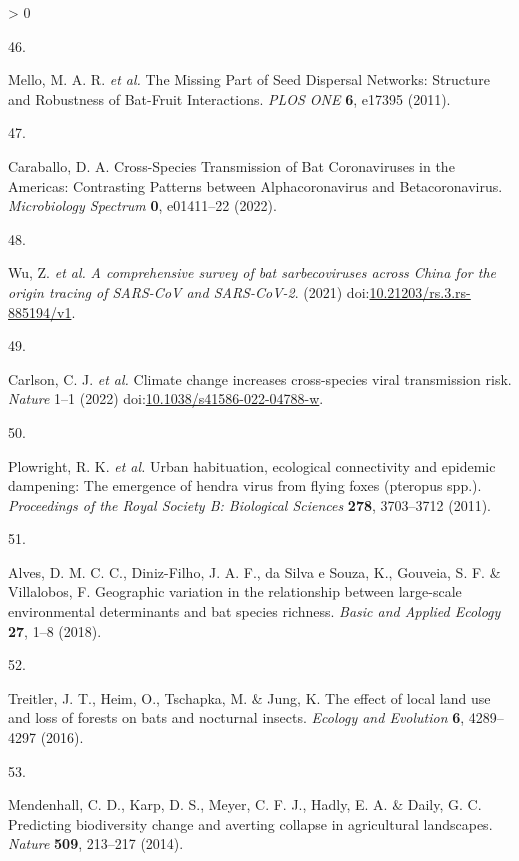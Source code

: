 \documentclass[10pt,oneside]{article}
\newlength{\cslhangindent}
\newlength{\csllabelwidth}
\newenvironment{CSLReferences}[3] %
 {%
  \setlength{\parindent}{0pt}
  \ifodd #1 \everypar{\setlength{\hangindent}{\cslhangindent}}\ignorespaces\fi
  \ifnum #2 > 0
  \setlength{\parskip}{#2\baselineskip}
  \fi
 }%
 {}
\newcommand{\CSLLeftMargin}[1]{\parbox[t]{\maxof{\widthof{#1}}{\csllabelwidth}}{#1}}
\newcommand{\CSLRightInline}[1]{\parbox[t]{\linewidth}{#1}}
\begin{document}
\begin{CSLReferences}{0}{0}
\leavevmode\hypertarget{ref-Mello2011Missing}{}%
\CSLLeftMargin{46. }
\CSLRightInline{Mello, M. A. R. \emph{et al.} The Missing Part of Seed
Dispersal Networks: Structure and Robustness of Bat-Fruit Interactions.
\emph{PLOS ONE} \textbf{6}, e17395 (2011).}

\leavevmode\hypertarget{ref-Caraballo2022Crossspecies}{}%
\CSLLeftMargin{47. }
\CSLRightInline{Caraballo, D. A. Cross-Species Transmission of Bat
Coronaviruses in the Americas: Contrasting Patterns between
Alphacoronavirus and Betacoronavirus. \emph{Microbiology Spectrum}
\textbf{0}, e01411--22 (2022).}

\leavevmode\hypertarget{ref-Wu2021Comprehensive}{}%
\CSLLeftMargin{48. }
\CSLRightInline{Wu, Z. \emph{et al.} \emph{A comprehensive survey of bat
sarbecoviruses across China for the origin tracing of SARS-CoV and
SARS-CoV-2}. (2021)
doi:\href{https://doi.org/10.21203/rs.3.rs-885194/v1}{10.21203/rs.3.rs-885194/v1}.}

\leavevmode\hypertarget{ref-Carlson2022Climate}{}%
\CSLLeftMargin{49. }
\CSLRightInline{Carlson, C. J. \emph{et al.} Climate change increases
cross-species viral transmission risk. \emph{Nature} 1--1 (2022)
doi:\href{https://doi.org/10.1038/s41586-022-04788-w}{10.1038/s41586-022-04788-w}.}

\leavevmode\hypertarget{ref-Plowright2011Urban}{}%
\CSLLeftMargin{50. }
\CSLRightInline{Plowright, R. K. \emph{et al.} Urban habituation,
ecological connectivity and epidemic dampening: The emergence of hendra
virus from flying foxes (pteropus spp.). \emph{Proceedings of the Royal
Society B: Biological Sciences} \textbf{278}, 3703--3712 (2011).}

\leavevmode\hypertarget{ref-Alves2018Geographic}{}%
\CSLLeftMargin{51. }
\CSLRightInline{Alves, D. M. C. C., Diniz-Filho, J. A. F., da Silva e
Souza, K., Gouveia, S. F. \& Villalobos, F. Geographic variation in the
relationship between large-scale environmental determinants and bat
species richness. \emph{Basic and Applied Ecology} \textbf{27}, 1--8
(2018).}

\leavevmode\hypertarget{ref-Treitler2016Effect}{}%
\CSLLeftMargin{52. }
\CSLRightInline{Treitler, J. T., Heim, O., Tschapka, M. \& Jung, K. The
effect of local land use and loss of forests on bats and nocturnal
insects. \emph{Ecology and Evolution} \textbf{6}, 4289--4297 (2016).}

\leavevmode\hypertarget{ref-Mendenhall2014Predictinga}{}%
\CSLLeftMargin{53. }
\CSLRightInline{Mendenhall, C. D., Karp, D. S., Meyer, C. F. J., Hadly,
E. A. \& Daily, G. C. Predicting biodiversity change and averting
collapse in agricultural landscapes. \emph{Nature} \textbf{509},
213--217 (2014).}


\end{CSLReferences}
\end{document}
